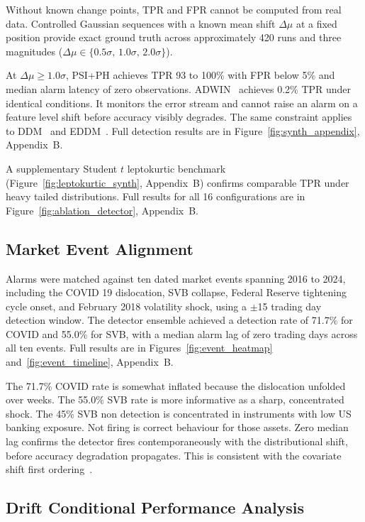 Without known change points, TPR and FPR cannot be computed from real data. Controlled Gaussian sequences with a known mean shift $\Delta\mu$ at a fixed position provide exact ground truth across approximately 420 runs and three magnitudes ($\Delta\mu \in \{0.5\sigma,\, 1.0\sigma,\, 2.0\sigma\}$).

At $\Delta\mu \geq 1.0\sigma$, PSI+PH achieves TPR 93 to 100\% with FPR below 5\% and median alarm latency of zero observations. ADWIN~\cite{bifet2007adwin,gama2014survey} achieves 0.2\% TPR under identical conditions. It monitors the error stream and cannot raise an alarm on a feature level shift before accuracy visibly degrades. The same constraint applies to DDM~\cite{gama2004ddm} and EDDM~\cite{baenagarcia2006eddm}. Full detection results are in Figure~\ref{fig:synth_appendix}, Appendix~B.

A supplementary Student $t$ leptokurtic benchmark (Figure~\ref{fig:leptokurtic_synth}, Appendix~B) confirms comparable TPR under heavy tailed distributions. Full results for all 16 configurations are in Figure~\ref{fig:ablation_detector}, Appendix~B.

\subsection{Market Event Alignment}
\label{subsec:market_events}

Alarms were matched against ten dated market events spanning 2016 to 2024, including the COVID 19 dislocation, SVB collapse, Federal Reserve tightening cycle onset, and February 2018 volatility shock, using a $\pm$15 trading day detection window. The detector ensemble achieved a detection rate of 71.7\% for COVID and 55.0\% for SVB, with a median alarm lag of zero trading days across all ten events. Full results are in Figures~\ref{fig:event_heatmap} and~\ref{fig:event_timeline}, Appendix~B.

The 71.7\% COVID rate is somewhat inflated because the dislocation unfolded over weeks. The 55.0\% SVB rate is more informative as a sharp, concentrated shock. The 45\% SVB non detection is concentrated in instruments with low US banking exposure. Not firing is correct behaviour for those assets. Zero median lag confirms the detector fires contemporaneously with the distributional shift, before accuracy degradation propagates. This is consistent with the covariate shift first ordering~\cite{gama2014survey}.

\subsection{Drift Conditional Performance Analysis}
\label{subsec:drift_conditional}

